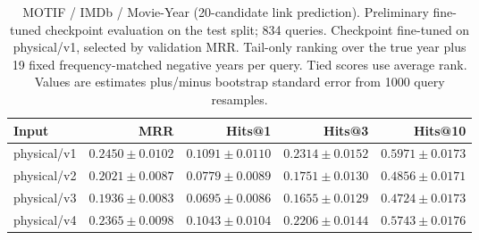 \begin{table}[t]
\centering
\small
\begin{tabular}{lrrrr}
\toprule
Input & MRR & Hits@1 & Hits@3 & Hits@10 \\
\midrule
physical/v1 & $0.2450 \pm 0.0102$ & $0.1091 \pm 0.0110$ & $0.2314 \pm 0.0152$ & $0.5971 \pm 0.0173$ \\
physical/v2 & $0.2021 \pm 0.0087$ & $0.0779 \pm 0.0089$ & $0.1751 \pm 0.0130$ & $0.4856 \pm 0.0171$ \\
physical/v3 & $0.1936 \pm 0.0083$ & $0.0695 \pm 0.0086$ & $0.1655 \pm 0.0129$ & $0.4724 \pm 0.0173$ \\
physical/v4 & $0.2365 \pm 0.0098$ & $0.1043 \pm 0.0104$ & $0.2206 \pm 0.0144$ & $0.5743 \pm 0.0176$ \\
\bottomrule
\end{tabular}
\caption{MOTIF / IMDb / Movie-Year (20-candidate link prediction). Preliminary fine-tuned checkpoint evaluation on the test split; 834 queries. Checkpoint fine-tuned on physical/v1, selected by validation MRR. Tail-only ranking over the true year plus 19 fixed frequency-matched negative years per query. Tied scores use average rank. Values are estimates plus/minus bootstrap standard error from 1000 query resamples.}
\label{tab:motif-movie_year-link_prediction}
\end{table}
